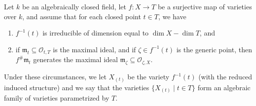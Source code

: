 Let $k$ be an algebraically closed field, let $f: X \to T$ be a surjective map of varieties over $k$, and assume that for each closed point $t \in T$, we have

\begin{enumerate}
  \item[(1)] $f^{-1}(t)$ is irreducible of dimension equal to $\dim X - \dim T$, and
  \item[(2)] if $\mathfrak{m}_t \subseteq \mathcal{O}_{t,T}$ is the maximal ideal, and if $\zeta \in f^{-1}(t)$ is the generic point, then $f^\# \mathfrak{m}_t$ generates the maximal ideal $\mathfrak{m}_\zeta \subseteq \mathcal{O}_{\zeta,X}$.
\end{enumerate}

Under these circumstances, we let $X_{(t)}$ be the variety $f^{-1}(t)$ (with the reduced induced structure) and we say that the varieties $\{X_{(t)} \mid t \in T\}$ form an algebraic family of varieties parametrized by $T$.
